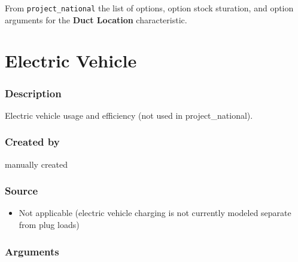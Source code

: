 From \texttt{project\_national} the list of options, option stock
sturation, and option arguments for the \textbf{Duct Location}
characteristic.





\section{Electric Vehicle}\label{electric_vehicle}

\subsubsection{Description}\label{description-39}

Electric vehicle usage and efficiency (not used in project\_national).

\subsubsection{Created by}\label{created-by-39}

manually created

\subsubsection{Source}\label{source-38}

\begin{itemize}
 
\item
  Not applicable (electric vehicle charging is not currently modeled
  separate from plug loads)
\end{itemize}

\subsubsection{Arguments}\label{arguments-26}

